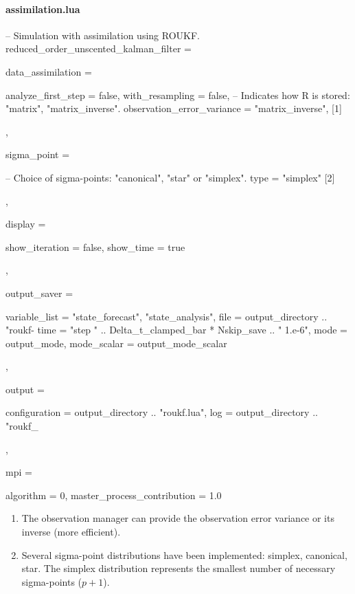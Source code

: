 \documentclass{tufte-book}
\newcounter{points}
\begin{document}
 \paragraph{assimilation.lua}
 \begin{frame_lua}
-- Simulation with assimilation using ROUKF.
reduced_order_unscented_kalman_filter = {

   data_assimilation = {

      analyze_first_step = false,
      with_resampling = false,
      -- Indicates how R is stored: "matrix", "matrix_inverse".
      observation_error_variance = "matrix_inverse", [1]

   },

   sigma_point = {

      -- Choice of sigma-points: "canonical", "star" or "simplex".
      type = "simplex" [2]

   },

   display = {

      show_iteration = false,
      show_time = true

   },

   output_saver = {

      variable_list = {"state_forecast", "state_analysis"},
      file = output_directory .. "roukf-%
      time = "step " .. Delta_t_clamped_bar * Nskip_save .. " 1.e-6",
      mode = output_mode,
      mode_scalar = output_mode_scalar

   },

   output = {

     configuration = output_directory .. "roukf.lua",
     log = output_directory .. "roukf_%

   },

   mpi = {

        algorithm = 0,
        master_process_contribution = 1.0
    }

}

 \end{frame_lua}

 \begin{enumerate}

 \item The observation manager can provide the observation error variance or its inverse (more efficient).

\item Several sigma-point distributions have been implemented: simplex, canonical, star. The simplex distribution represents the smallest number of necessary sigma-points ($p + 1$).

 \end{enumerate}
\end{document}
